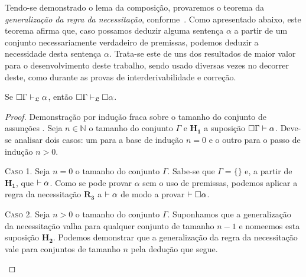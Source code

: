     \vspace{.5\baselineskip}
    Tendo-se demonstrado o lema da composição, provaremos o teorema da \emph{generalização da regra da necessitação}, conforme~\cite{Troelstra}.
    Como apresentado abaixo, este teorema afirma que, caso possamos deduzir alguma sentença $\alpha$ a partir de um conjunto necessariamente verdadeiro de premissas, podemos deduzir a necessidade desta sentença $\alpha$.
    Trata-se este de uns dos resultados de maior valor para o desenvolvimento deste trabalho, sendo usado diversas vezes no decorrer deste, como durante as provas de interderivabilidade e correção.
    \vspace{.5\baselineskip}
    \begin{tcolorbox}[enhanced jigsaw, breakable, sharp corners, colframe=black, colback=white, boxrule=0.5pt, left=1.5mm, right=1.5mm, top=1.5mm, bottom=1.5mm]
    \begin{theorem}\label{generalization}
        Se $\Box\Gamma\mathrel{\vdash}_{\mathfrak{L}}\alpha$, então $\Box\Gamma\mathrel{\vdash}_{\mathfrak{L}}\Box\alpha$.
        \begin{proof}
            Demonstração por indução fraca sobre o tamanho do conjunto de assunções \citep{Troelstra}.
            Seja $n\in\mathbb{N}$ o tamanho do conjunto $\Gamma$ e $\mathbf{H_1}$ a suposição $\Box\Gamma\mathrel{\vdash}\alpha$.
            Deve-se analisar dois casos: um para a base de indução $n=0$ e o outro para o passo de indução $n>0$.
            \begin{adjustwidth}{0pt}{}
            \vspace{.5\baselineskip}
            \textsc{Caso 1.}
            Seja $n=0$ o tamanho do conjunto $\Gamma$.
            Sabe-se que $\Gamma=\{\}$ e, a partir de $\mathbf{H_1}$, que ${\mathrel{\vdash}\alpha}$.
            Como se pode provar $\alpha$ sem o uso de premissas, podemos aplicar a regra da necessitação \hyperref[necessitation]{$\mathbf{R_3}$} a ${\mathrel{\vdash}\alpha}$ de modo a provar ${\mathrel{\vdash}\Box\alpha}$.
            \end{adjustwidth}
            \begin{case}
            \vspace{1\baselineskip}
            \textsc{Caso 2.} 
            Seja $n>0$ o tamanho do conjunto $\Gamma$.
            Suponhamos que a generalização da necessitação valha para qualquer conjunto de tamanho $n-1$ e nomeemos esta suposição $\mathbf{H_2}$.
            Podemos demonstrar que a generalização da regra da necessitação vale para conjuntos de tamanho $n$ pela dedução que segue.
            \end{case}


\end{proof}
\end{theorem}
\end{tcolorbox}
